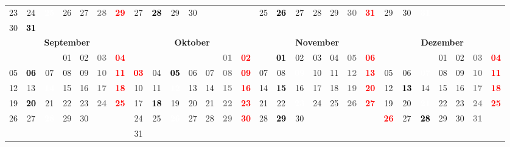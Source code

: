 \documentclass[10pt,a4paper,landscape]{article}
\newcommand{\yb}[1]{\cellcolor{yellow}\textcolor{black}{\bf #1}}
\newcommand{\iv}[1]{\cellcolor{black}\textcolor{white}{\bf #1}}
\newcommand{\rb}[1]{\textbf{\textcolor{red}{#1}}}
\newcommand{\hv}[1]{\textbf{\textcolor{Gray}{#1}}}
\begin{document}
\begin{tabular}{|ccccccc|ccccccc|ccccccc|ccccccc|}
23 & 24 & \iv{25} & 26 & 27 & \hv{28} & \rb{29} & 27 & \yb{28} & 29 & 30 & & & & 25 & \yb{26} & 27 & 28 & 29 & \hv{30} & \rb{31} & 29 & 30 & \iv{31} & & & &  \\
30 & \yb{31} & & & & & & & & & & & & & & & & & & & & & & & & & &  \\
\hline
\multicolumn{7}{|c|}{\bf September} & \multicolumn{7}{|c|}{\bf Oktober} & \multicolumn{7}{|c|}{\bf November} & \multicolumn{7}{|c|}{\bf Dezember} \\
& & & 01 & 02 & \hv{03} & \rb{04} & & & & & & \hv{01} & \rb{02} & & \yb{01} & 02 & 03 & 04 & \hv{05} & \rb{06} & & & & 01 & 02 & \hv{03} & \rb{04} \\
05 & \yb{06} & 07 & 08 & 09 & \hv{10} & \rb{11} & \rb{03} & 04 & \yb{05} & 06 & 07 & \hv{08} & \rb{09} & 07 & 08 & \iv{09} & 10 & 11 & \hv{12} & \rb{13} & 05 & 06 & \iv{07} & 08 & 09 & \hv{10} & \rb{11} \\
12 & 13 & \iv{14} & 15 & 16 & \hv{17} & \rb{18} & 10 & 11 & \iv{12} & 13 & 14 & \hv{15} & \rb{16} & 14 & \yb{15} & 16 & 17 & 18 & \hv{19} & \rb{20} & 12 & \yb{13} & 14 & 15 & 16 & \hv{17} & \rb{18} \\
19 & \yb{20} & 21 & 22 & 23 & \hv{24} & \rb{25} & 17 & \yb{18} & 19 & 20 & 21 & \hv{22} & \rb{23} & 21 & 22 & \iv{23} & 24 & 25 & \hv{26} & \rb{27} & 19 & 20 & \iv{21} & 22 & 23 & \hv{24} & \rb{25} \\
26 & 27 & \iv{28} & 29 & 30 & & & 24 & 25 & \iv{26} & 27 & 28 & \hv{29} & \rb{30} & 28 & \yb{29} & 30 & & & & & \rb{26} & 27 & \yb{28} & 29 & 30 & \hv{31} &  \\
& & & & & & & 31 & & & & & & & & & & & & & & & & & & & &  \\
\hline
\end{tabular}
\end{document}
